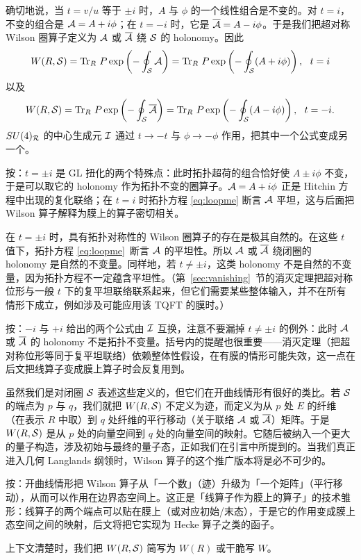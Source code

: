 确切地说，当 $t=v/u$ 等于 $\pm i$ 时，$A$ 与 $\phi$ 的一个线性组合是不变的。对 $t=i$，不变的组合是 $\CA=A+i\phi$；在 $t=-i$ 时，它是 $\overline\CA=A-i\phi$。于是我们把超对称 Wilson 圈算子定义为 $\CA$ 或 $\overline\CA$ 绕 ${\cal S}$ 的 holonomy。因此
\setcounter{equation}{3}
\begin{equation}\label{eq:ymop}
W(R,{\cal S})=\Tr_R\,P\exp\left(-\oint_{{\cal
S}}\CA\right)=\Tr_R\,P\exp\left(-\oint_{{\cal
S}}(A+i\phi)\right),~~ t=i
\end{equation}
以及 %
\setcounter{equation}{4}
\begin{equation}\label{eq:jymop}
W(R,{{\cal S}})=
\Tr_R\,P\exp\left(-\oint_{{\cal S}}{\overline\CA}\right)
=\Tr_R\,P\exp\left(-\oint_{{\cal S}}(A-i\phi)\right), ~~t=-i.
\end{equation}
$SU(4)_{{\cal R}}$ 的中心生成元 $\EUI$ 通过 $t\to -t$ 与 $\phi\to -\phi$ 作用，把其中一个公式变成另一个。

\begin{yizhu}[物理图像]
按：$t=\pm i$ 是 GL 扭化的两个特殊点：此时拓扑超荷的组合恰好使 $A\pm i\phi$ 不变，于是可以取它的 holonomy 作为拓扑不变的圈算子。$\CA=A+i\phi$ 正是 Hitchin 方程中出现的复化联络；在 $t=i$ 时拓扑方程 \eqref{eq:loopme} 断言 $\CA$ 平坦，这与后面把 Wilson 算子解释为膜上的算子密切相关。
\end{yizhu}

在 $t=\pm i$ 时，具有拓扑对称性的 Wilson 圈算子的存在是极其自然的。在这些 $t$ 值下，拓扑方程 \eqref{eq:loopme}\ 断言 $\CA$ 的平坦性。所以 $\CA$ 或 $\bar\CA$ 绕闭圈的 holonomy 是自然的不变量。同样地，若 $t\not=\pm i$，这类 holonomy 不是自然的不变量，因为拓扑方程不一定蕴含平坦性。（第~\ref{sec:vanishing}~节的消灭定理把超对称位形与一般 $t$ 下的复平坦联络联系起来，但它们需要某些整体输入，并不在所有情形下成立，例如涉及可能应用该 TQFT 的膜时。）

\begin{yizhu}[易错点]
按：$-i$ 与 $+i$ 给出的两个公式由 $\EUI$ 互换，注意不要漏掉 $t\not=\pm i$ 的例外：此时 $\CA$ 或 $\bar\CA$ 的 holonomy 不是拓扑不变量。括号内的提醒也很重要——消灭定理（把超对称位形等同于复平坦联络）依赖整体性假设，在有膜的情形可能失效，这一点在后文把线算子变成膜上算子时会反复用到。
\end{yizhu}

虽然我们是对闭圈 ${\cal S}$ 表述这些定义的，但它们在开曲线情形有很好的类比。若 ${\cal S}$ 的端点为 $p$ 与 $q$，我们就把 $W(R,{{\cal S}})$ 不定义为迹，而定义为从 $p$ 处 $E$ 的纤维（在表示 $R$ 中取）到 $q$ 处纤维的平行移动（关于联络 $\CA$ 或 $\bar\CA$）矩阵。于是 $W(R,{{\cal S}})$ 是从 $p$ 处的向量空间到 $q$ 处的向量空间的映射。它随后被纳入一个更大的量子构造，涉及初始与最终的量子态，正如我们在引言中所提到的。当我们真正进入几何 Langlands 纲领时，Wilson 算子的这个推广版本将是必不可少的。

\begin{yizhu}[物理图像]
按：开曲线情形把 Wilson 算子从「一个数」（迹）升级为「一个矩阵」（平行移动），从而可以作用在边界态空间上。这正是「线算子作为膜上的算子」的技术雏形：线算子的两个端点可以贴在膜上（或对应初始/末态），于是它的作用变成膜上态空间之间的映射，后文将把它实现为 Hecke 算子之类的函子。
\end{yizhu}

上下文清楚时，我们把 $W(R,{{\cal S}})$ 简写为 $W(R)$ 或干脆写 $W$。
